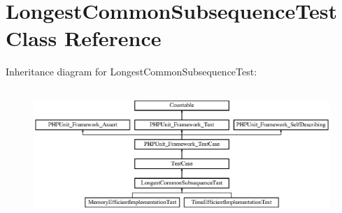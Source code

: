 \hypertarget{class_sebastian_bergmann_1_1_diff_1_1_l_c_s_1_1_longest_common_subsequence_test}{}\section{Longest\+Common\+Subsequence\+Test Class Reference}
\label{class_sebastian_bergmann_1_1_diff_1_1_l_c_s_1_1_longest_common_subsequence_test}
Inheritance diagram for Longest\+Common\+Subsequence\+Test\+:\begin{figure}[H]
\begin{center}
\leavevmode
\includegraphics[height=4.955752cm]{class_sebastian_bergmann_1_1_diff_1_1_l_c_s_1_1_longest_common_subsequence_test}
\end{center}
\end{figure}
